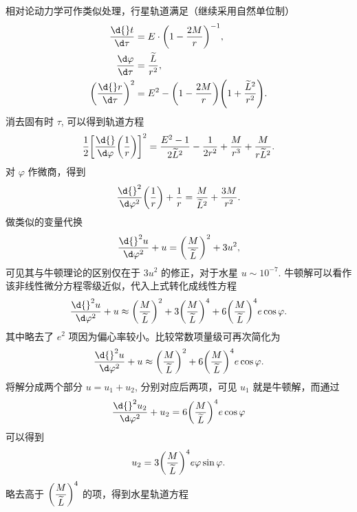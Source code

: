 \documentclass[UTF8, 12pt, a4paper, oneside, onecolumn, fontset=none]{ctexart}
\begin{document}
相对论动力学可作类似处理，行星轨道满足（继续采用自然单位制）
\begin{align}
\frac{\d{}t}{\d\tau}&=E\cdot\mleft(1-\frac{2M}{r}\mright)^{-1},\\
\frac{\d\varphi}{\d\tau}&=\frac{\widetilde{L}}{r^{2}},\\
\mleft(\frac{\d{}r}{\d\tau}\mright)^{2}&=E^{2}-\mleft(1-\frac{2M}{r}\mright)\mleft(1+\frac{\widetilde{L}^{2}}{r^{2}}\mright).
\end{align}
消去固有时 $\tau$, 可以得到轨道方程
\begin{equation}
\frac{1}{2}\mleft[\frac{\d{}}{\d\varphi}\mleft(\frac{1}{r}\mright)\mright]^{2}=\frac{E^{2}-1}{2\widetilde{L}^{2}}-\frac{1}{2r^{2}}+\frac{M}{r^{3}}+\frac{M}{r\widetilde{L}^{2}}.
\end{equation}
对 $\varphi$ 作微商，得到
\begin{equation}
\frac{\d{}^{2}}{\d\varphi^{2}}\mleft(\frac{1}{r}\mright)+\frac{1}{r}=\frac{M}{\widetilde{L}^{2}}+\frac{3M}{r^{2}}.
\end{equation}
做类似的变量代换
\begin{equation}
\frac{\d{}^{2}u}{\d\varphi^{2}}+u=\mleft(\frac{M}{\widetilde{L}}\mright)^{2}+3u^{2},
\end{equation}
可见其与牛顿理论的区别仅在于 $3u^{2}$ 的修正，对于水星 $u\sim10^{-7}$. 牛顿解可以看作该非线性微分方程零级近似，代入上式转化成线性方程
\begin{equation}
\frac{\d{}^{2}u}{\d\varphi^{2}}+u\approx\mleft(\frac{M}{\widetilde{L}}\mright)^{2}+3\mleft(\frac{M}{\widetilde{L}}\mright)^{4}+6\mleft(\frac{M}{\widetilde{L}}\mright)^{4}e\cos{\varphi}.
\end{equation}
其中略去了 $e^{2}$ 项因为偏心率较小。比较常数项量级可再次简化为
\begin{equation}
\frac{\d{}^{2}u}{\d\varphi^{2}}+u\approx\mleft(\frac{M}{\widetilde{L}}\mright)^{2}+6\mleft(\frac{M}{\widetilde{L}}\mright)^{4}e\cos{\varphi}.
\end{equation}
将解分成两个部分 $u=u_{1}+u_{2}$, 分别对应后两项，可见 $u_{1}$ 就是牛顿解，而通过
\begin{equation}
\frac{\d{}^{2}u_{2}}{\d\varphi^{2}}+u_{2}=6\mleft(\frac{M}{\widetilde{L}}\mright)^{4}e\cos{\varphi}
\end{equation}
可以得到
\begin{equation}
u_{2}=3\mleft(\frac{M}{\widetilde{L}}\mright)^{4}e\varphi\sin{\varphi}.
\end{equation}
略去高于 $\mleft(\dfrac{M}{\widetilde{L}}\mright)^{4}$ 的项，得到水星轨道方程
\end{document}
